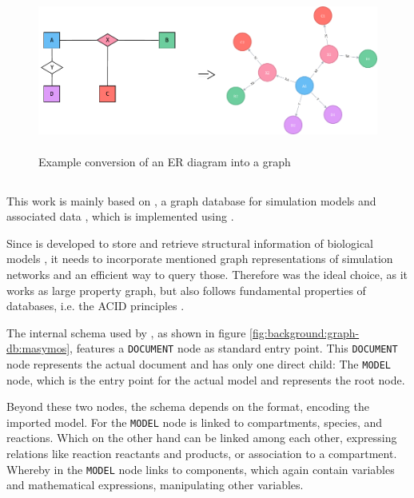 \begin{figure}
	\center
	\includegraphics[height=150pt]{resources/er-to-neo4j.pdf}
	\caption{Example conversion of an ER diagram into a \neoj graph}
	
	
	\label{fig:example-er-diagram}
\end{figure}

\subsection{\masymos}
\label{sec:background:graph-db:masymos}

This work is mainly based on \masymos, a graph database for simulation models and associated data \citep{Henkel2015}, which is implemented using \neoj \citep{Robinson2013}.

Since \masymos is developed to store and retrieve structural information of biological models \citep{Henkel2015}, it needs to incorporate mentioned graph representations of simulation networks and an efficient way to query those. Therefore \neoj was the ideal choice, as it works as large property graph, but also follows fundamental properties of databases, i.e. the ACID principles \citep{Henkel2015}.

The internal schema used by \masymos, as shown in figure \ref{fig:background:graph-db:masymos}, features a \texttt{DOCUMENT} node as standard entry point. This \texttt{DOCUMENT} node represents the actual \xml document and has only one direct child: The \texttt{MODEL} node, which is the entry point for the actual model and represents the \xml root node.

Beyond these two nodes, the schema depends on the format, encoding the imported model. For \sbml the \texttt{MODEL} node is linked to compartments, species, and reactions. Which on the other hand can be linked among each other, expressing relations like reaction reactants and products, or association to a compartment.
Whereby in \cellml the \texttt{MODEL} node links to components, which again contain variables and mathematical expressions, manipulating other variables.

